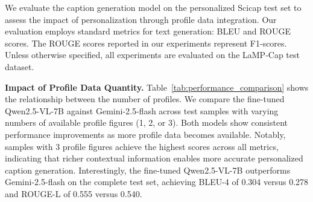 \documentclass{article} %
\begin{document}
\begin{table}[h]
\centering
\renewcommand{\arraystretch}{1.5}
\caption{Performance evaluation of different input configurations.}
\label{tab:profile_performance}
\end{table}

We evaluate the caption generation model on the personalized Scicap test set to assess the impact of personalization through profile data integration. Our evaluation employs standard metrics for text generation: BLEU and ROUGE scores. The ROUGE scores reported in our experiments represent F1-scores. Unless otherwise specified, all experiments are evaluated on the LaMP-Cap test dataset.

\noindent \textbf{Impact of Profile Data Quantity.} Table~\ref{tab:performance_comparison} shows the relationship between the number of profiles. We compare the fine-tuned Qwen2.5-VL-7B against Gemini-2.5-flash across test samples with varying numbers of available profile figures (1, 2, or 3). Both models show consistent performance improvements as more profile data becomes available. Notably, samples with 3 profile figures achieve the highest scores across all metrics, indicating that richer contextual information enables more accurate personalized caption generation. Interestingly, the fine-tuned Qwen2.5-VL-7B outperforms Gemini-2.5-flash on the complete test set, achieving BLEU-4 of 0.304 versus 0.278 and ROUGE-L of 0.555 versus 0.540.
\end{document}
